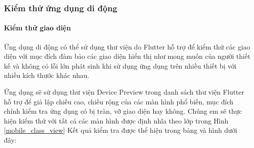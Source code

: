 \subsubsection{Kiểm thử ứng dụng di động}

\paragraph{Kiểm thử giao diện}
\mbox{}

Ứng dụng di động có thể sử dụng thư viện do Flutter hỗ trợ để kiểm thử các giao diện với mục đích
đảm bảo các giao diện hiển thị như mong muốn của người thiết kế và không có lỗi lớn phát sinh khi sử dụng
ứng dụng trên nhiều thiết bị với nhiều kích thước khác nhau.

Ứng dụng sẽ sử dụng thư viện Device Preview trong danh sách thư viện Flutter hỗ trợ để giả lập chiều cao, chiều rộng của
các màn hình phổ biến, mục đích chính kiểm tra ứng dụng có bị tràn, vỡ giao diện hay không. Chúng em sẽ thực hiện kiểm thử
với tất cả các màn hình được định nhĩa theo lớp trong Hình \ref{mobile_class_view} Kết quả kiểm tra được thể hiện
trong bảng và hình dưới đây: 

